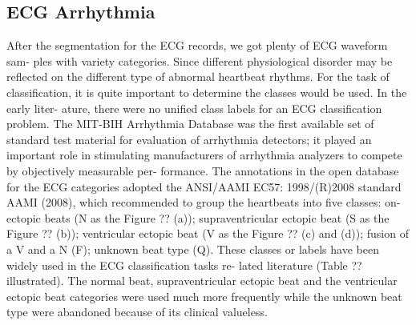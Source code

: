 \documentclass[journal]{IEEEtran}
\begin{document}
\subsection{ECG Arrhythmia}
After the segmentation for the ECG records, we got plenty of ECG waveform sam- ples with variety categories. Since different physiological disorder may be reflected on the different type of abnormal heartbeat rhythms. For the task of classification, it is quite important to determine the classes would be used. In the early liter- ature, there were no unified class labels for an ECG classification problem. The MIT-BIH Arrhythmia Database was the first available set of standard test material for evaluation of arrhythmia detectors; it played an important role in stimulating manufacturers of arrhythmia analyzers to compete by objectively measurable per- formance. The annotations in the open database for the ECG categories adopted the ANSI/AAMI EC57: 1998/(R)2008 standard AAMI (2008), which recommended to group the heartbeats into five classes: on-ectopic beats (N as the Figure ?? (a)); supraventricular ectopic beat (S as the Figure ?? (b)); ventricular ectopic beat (V as the Figure ?? (c) and (d)); fusion of a V and a N (F); unknown beat type (Q). These classes or labels have been widely used in the ECG classification tasks re- lated literature (Table ?? illustrated). The normal beat, supraventricular ectopic beat and the ventricular ectopic beat categories were used much more frequently while the unknown beat type were abandoned because of its clinical valueless.
\end{document}
